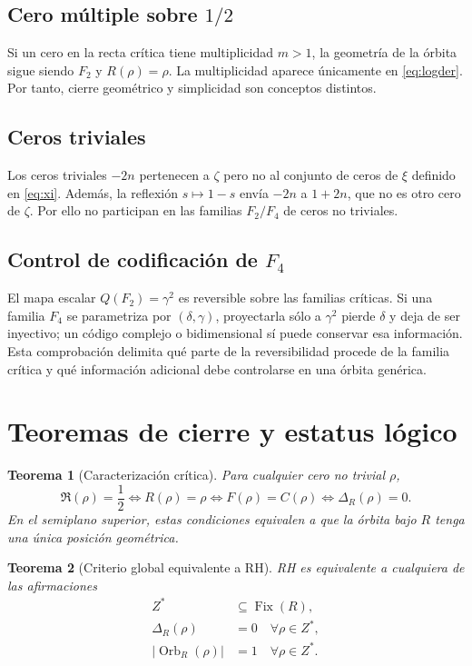 \documentclass[11pt]{amsart}
\newtheorem{theorem}{Teorema}[section]
\theoremstyle{definition}
\theoremstyle{remark}
\begin{document}
\subsection{Cero múltiple sobre $1/2$}
Si un cero en la recta crítica tiene multiplicidad $m>1$, la geometría de la órbita sigue siendo $F_2$ y $R(\rho)=\rho$. La multiplicidad aparece únicamente en \eqref{eq:logder}. Por tanto, cierre geométrico y simplicidad son conceptos distintos.

\subsection{Ceros triviales}
Los ceros triviales $-2n$ pertenecen a $\zeta$ pero no al conjunto de ceros de $\xi$ definido en \eqref{eq:xi}. Además, la reflexión $s\mapsto1-s$ envía $-2n$ a $1+2n$, que no es otro cero de $\zeta$. Por ello no participan en las familias $F_2/F_4$ de ceros no triviales.

\subsection{Control de codificación de $F_4$}
El mapa escalar $Q(F_2)=\gamma^2$ es reversible sobre las familias críticas. Si una familia $F_4$ se parametriza por $(\delta,\gamma)$, proyectarla sólo a $\gamma^2$ pierde $\delta$ y deja de ser inyectivo; un código complejo o bidimensional sí puede conservar esa información. Esta comprobación delimita qué parte de la reversibilidad procede de la familia crítica y qué información adicional debe controlarse en una órbita genérica.

\section{Teoremas de cierre y estatus lógico}
\begin{theorem}[Caracterización crítica]
Para cualquier cero no trivial $\rho$,
\begin{equation}
 \Re(\rho)=\frac12
 \iff R(\rho)=\rho
 \iff F(\rho)=C(\rho)
 \iff \Delta_R(\rho)=0.
\end{equation}
En el semiplano superior, estas condiciones equivalen a que la órbita bajo $R$ tenga una única posición geométrica.
\end{theorem}

\begin{theorem}[Criterio global equivalente a RH]
RH es equivalente a cualquiera de las afirmaciones
\begin{align}
 Z^*&\subseteq\operatorname{Fix}(R),\\
 \Delta_R(\rho)&=0\quad\forall\rho\in Z^*,\\
 |\operatorname{Orb}_R(\rho)|&=1\quad\forall\rho\in Z^*.
\end{align}
\end{theorem}
\end{document}
